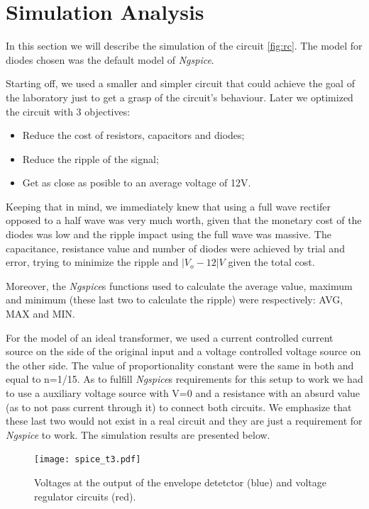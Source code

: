\section{Simulation Analysis}
\label{sec:simulation}

In this section we will describe the simulation of the circuit \ref{fig:rc}.
The model for diodes chosen was the default model of \emph{Ngspice}.

Starting off, we used a smaller and simpler circuit that could achieve
the goal of the laboratory just to get a grasp of the circuit's behaviour.
Later we optimized the circuit with 3 objectives:
\begin{itemize}
  \item Reduce the cost of resistors, capacitors and diodes;
  \item Reduce the ripple of the signal;
  \item Get as close as posible to an average voltage of 12V.
\end{itemize}
Keeping that in mind, we immediately knew that using a full wave rectifer opposed to a half wave
was very much worth, given that the monetary cost of the diodes was low and the ripple impact using the full wave was massive.
The capacitance, resistance value and number of diodes were achieved by trial and error, trying to minimize the
ripple and $|V_{o}-12|V$ given the total cost.

Moreover, the \emph{Ngspice}\textquotesingle s functions used to calculate the average value, maximum and minimum (these last two to calculate the ripple)
were respectively: AVG, MAX and MIN.

For the model of an ideal transformer, we used a current controlled current source on the side of the original input
and a voltage controlled voltage source on the other side.
The value of proportionality constant were the same in both and equal to n=1/15.
As to fulfill \emph{Ngspice}\textquotesingle s requirements for this setup to work we had to use a auxiliary voltage source with V=0
and a resistance with an absurd value (as to not pass current through it) to connect both circuits. We
emphasize that these last two would not exist in a real circuit and they are just a requirement for \emph{Ngspice} to work. The simulation results are
presented below.

\begin{figure}[h] \centering
  \texttt{[image: spice\_t3.pdf]}
  \caption{Voltages at the output of the envelope detetctor (blue) and voltage regulator circuits (red).}
  \label{fig:11}
\end{figure}

